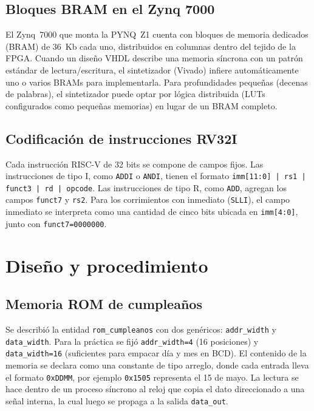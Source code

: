 \documentclass[12pt,letterpaper]{article}
\begin{document}
\subsection{Bloques BRAM en el Zynq 7000}
El Zynq~7000 que monta la PYNQ~Z1 cuenta con bloques de memoria dedicados (BRAM) de 36~Kb cada uno, distribuidos en columnas dentro del tejido de la FPGA. Cuando un diseño VHDL describe una memoria síncrona con un patrón estándar de lectura/escritura, el sintetizador (Vivado) infiere automáticamente uno o varios BRAMs para implementarla. Para profundidades pequeñas (decenas de palabras), el sintetizador puede optar por lógica distribuida (LUTs configurados como pequeñas memorias) en lugar de un BRAM completo.

\subsection{Codificación de instrucciones RV32I}
Cada instrucción RISC-V de 32 bits se compone de campos fijos. Las instrucciones de tipo I, como \texttt{ADDI} o \texttt{ANDI}, tienen el formato \mbox{\texttt{imm[11:0] | rs1 | funct3 | rd | opcode}}. Las instrucciones de tipo R, como \texttt{ADD}, agregan los campos \texttt{funct7} y \texttt{rs2}. Para los corrimientos con inmediato (\texttt{SLLI}), el campo inmediato se interpreta como una cantidad de cinco bits ubicada en \texttt{imm[4:0]}, junto con \texttt{funct7=0000000}.

\section{Diseño y procedimiento}

\subsection{Memoria ROM de cumpleaños}
Se describió la entidad \texttt{rom\_cumpleanos} con dos genéricos: \texttt{addr\_width} y \texttt{data\_width}. Para la práctica se fijó \texttt{addr\_width=4} (16 posiciones) y \texttt{data\_width=16} (suficientes para empacar día y mes en BCD). El contenido de la memoria se declara como una constante de tipo arreglo, donde cada entrada lleva el formato \texttt{0xDDMM}, por ejemplo \texttt{0x1505} representa el 15 de mayo. La lectura se hace dentro de un proceso síncrono al reloj que copia el dato direccionado a una señal interna, la cual luego se propaga a la salida \texttt{data\_out}.
\end{document}
